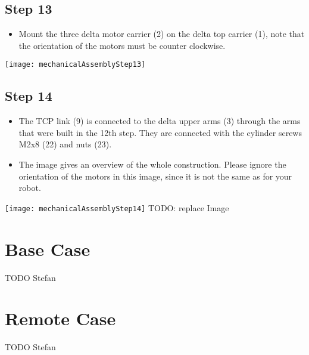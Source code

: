 \subsection*{Step 13}

\begin{minipage}[t]{0.6\textwidth}
	\begin{itemize}
		\item Mount the three delta motor carrier (2) on the delta top carrier (1), note that the orientation of the motors must be counter clockwise.
	\end{itemize}
\end{minipage}
\hfill
\begin{minipage}[t]{0.35\textwidth}
	\vspace{-\ht\strutbox}\texttt{[image: mechanicalAssemblyStep13]}
	\label{fig:MechanicalAssebmlyStep13} 
\end{minipage}

\subsection*{Step 14}

\begin{minipage}[t]{0.6\textwidth}
	\begin{itemize}
		\item The TCP link (9) is connected to the delta upper arms (3) through the arms that were built in the 12th step. They are connected with the cylinder screws M2x8 (22) and nuts (23).
		\item The image gives an overview of the whole construction. Please ignore the orientation of the motors in this image, since it is not the same as for your robot.
	\end{itemize}
\end{minipage}
\hfill
\begin{minipage}[t]{0.35\textwidth}
	\vspace{-\ht\strutbox}\texttt{[image: mechanicalAssemblyStep14]}
	TODO: replace Image
	\label{fig:MechanicalAssebmlyStep14} 
\end{minipage}

\section{Base Case}
TODO Stefan

\section{Remote Case}
TODO Stefan

